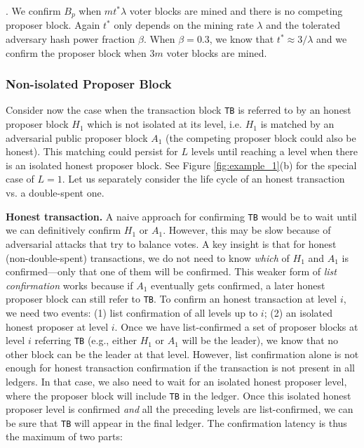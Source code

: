 \documentclass{article}
\begin{document}
. We confirm $B_p$ when $mt^*\lambda$ voter blocks are mined and there is no competing proposer block. Again $t^*$ only depends on the mining rate $\lambda$ and the tolerated adversary hash power fraction $\beta$.  
When $\beta = 0.3$, we know that  $t^* \approx 3/\lambda$ and we confirm the proposer block when $3m$ voter blocks are mined. 

\subsubsection*{Non-isolated Proposer Block}

Consider now the case when the transaction block \texttt{TB} is referred to by an honest proposer block $H_1$ which is not isolated at its level, i.e. $H_1$ is matched by an adversarial public proposer block $A_1$ (the competing proposer block could also be honest). This matching could persist for $L$ levels until reaching a level when there is an isolated honest proposer block. See Figure \ref{fig:example_1}(b) for the special case of $L=1$. 
Let us separately consider the life cycle of an honest transaction vs. a double-spent one.

\noindent \textbf{Honest transaction.}
A naive approach for confirming \texttt{TB} would be to wait until we can definitively confirm $H_1$ or $A_1$.
However, this may be slow because of adversarial attacks that try to balance votes.
A key insight is that for honest (non-double-spent) transactions, we do not need to know \emph{which} of $H_1$ and $A_1$ is confirmed---only that one of them will be confirmed.
This weaker form of \emph{list confirmation} works because if $A_1$ eventually gets confirmed, a later honest proposer block can still refer to \texttt{TB}. 
To confirm an honest transaction at level $i$, we need two events: (1) list confirmation of all levels up  to $i$; (2) an isolated honest proposer at level $i$.
Once we have list-confirmed a set of proposer blocks at level $i$ referring \texttt{TB} (e.g., either $H_1$ or $A_1$ will be the leader), we know that no other block can be the leader at that level.
However, list confirmation alone is not enough for honest transaction confirmation if the transaction is not present in all ledgers. 
In that case, we also need to wait for an isolated honest proposer level, where the proposer block will include \texttt{TB} in the ledger. 
Once this isolated honest proposer level is confirmed \emph{and} all the preceding levels are list-confirmed, we can be sure that \texttt{TB} will appear in the final ledger. 
The confirmation latency is thus the maximum of two parts:
\end{document}
